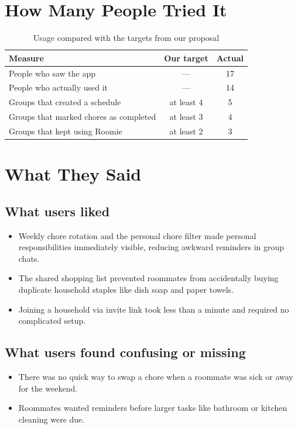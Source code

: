 \documentclass[11pt,a4paper]{article}
\begin{document}
\section{How Many People Tried It}
\begin{table}[h]
\centering
\begin{tabularx}{\textwidth}{X c c}
\toprule
\textbf{Measure} & \textbf{Our target} & \textbf{Actual} \\
\midrule
People who saw the app & --- & 17 \\
People who actually used it & --- & 14 \\
Groups that created a schedule & at least 4 & 5 \\
Groups that marked chores as completed & at least 3 & 4 \\
Groups that kept using Roomie & at least 2 & 3 \\
\bottomrule
\end{tabularx}
\caption{Usage compared with the targets from our proposal}
\end{table}

\section{What They Said}

\subsection{What users liked}
\begin{itemize}[noitemsep]
  \item Weekly chore rotation and the personal chore filter made personal responsibilities immediately visible, reducing awkward reminders in group chats.
  \item The shared shopping list prevented roommates from accidentally buying duplicate household staples like dish soap and paper towels.
  \item Joining a household via invite link took less than a minute and required no complicated setup.
\end{itemize}

\subsection{What users found confusing or missing}
\begin{itemize}[noitemsep]
  \item There was no quick way to swap a chore when a roommate was sick or away for the weekend.
  \item Roommates wanted reminders before larger tasks like bathroom or kitchen cleaning were due.
\end{itemize}
\end{document}
